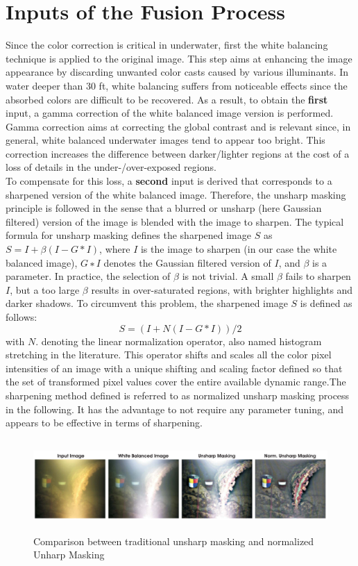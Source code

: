 \documentclass[hidelinks, 12pt]{report}
\begin{document}
\section{Inputs of the Fusion Process}
Since the color correction is critical in underwater, first the white balancing technique is applied to the original image. This step aims at enhancing the image appearance by discarding unwanted color casts caused by various illuminants. In water deeper than 30 ft, white balancing suffers from noticeable effects since the absorbed colors are difficult to be recovered. As a result, to obtain the \textbf{first} input, a gamma correction of the white balanced image version is performed. Gamma correction aims at correcting the global contrast and is relevant since, in general, white balanced underwater images tend to appear too bright. This correction increases the difference between darker/lighter regions at the cost of a loss of details in the under-/over-exposed regions.\\ To compensate for this loss, a \textbf{second} input is derived that corresponds to a sharpened version of the white balanced image. Therefore, the unsharp masking principle is followed in the sense that a blurred or unsharp (here Gaussian filtered) version of the image is blended with the image to sharpen. The typical formula for unsharp masking defines the sharpened image $S$ as $S=I+\beta(I-G*I)$, where $I$ is the image to sharpen (in our case the white balanced image), $G∗I$ denotes the Gaussian filtered version of $I$, and $\beta$ is a parameter. In practice, the selection of $\beta$ is not trivial. A small $\beta$ fails to sharpen $I$, but a too large $\beta$ results in over-saturated regions, with brighter highlights and darker shadows. To circumvent this problem, the sharpened image $S$ is defined as follows:
\begin{equation}
S=(I+N(I-G*I))/2
\end{equation}
with $N{.}$ denoting the linear normalization operator, also named histogram stretching in the literature. This operator shifts and scales all the color pixel intensities of an image with a unique shifting and scaling factor defined so that the set of transformed pixel values cover the entire available dynamic range.The sharpening method defined is referred to as normalized unsharp masking process in the following. It has the advantage to not require any parameter tuning, and appears to be effective in terms of sharpening. 
\begin{figure}[H]
\centering
\includegraphics[width=15cm,height=3.5cm]{NUM.png}
\caption[Comparison between traditional Unsharp Masking and normalized Unharp Masking]{Comparison between traditional unsharp masking and normalized Unharp Masking}
\label{Comparison between traditional Unsharp Masking and normalized Unharp Masking}
\end{figure}
\end{document}
